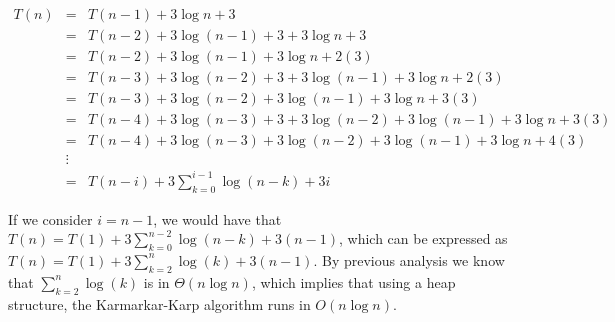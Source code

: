 \documentclass[tikz, 12pt]{scrartcl}
\begin{document}
\begin{eqnarray}
T(n)	&	=		&	T(n - 1) + 3 \log n + 3 \nonumber \\
		&	=		&	T(n - 2) + 3 \log(n - 1) + 3 + 3\log n + 3 \nonumber \\
		&	=		&	T(n - 2) + 3 \log(n - 1) + 3\log n + 2(3) \nonumber \\
		&	=		&	T(n - 3) + 3 \log(n - 2) + 3 + 3 \log(n - 1) + 3\log n + 2(3) \nonumber \\
		&	=		&	T(n - 3) + 3 \log(n - 2) + 3 \log(n - 1) + 3\log n + 3 (3) \nonumber \\
		&	=		&	T(n - 4) + 3 \log(n - 3) + 3  + 3 \log(n - 2) + 3 \log(n - 1) + 3\log n + 3 (3) \nonumber \\
		&	=		&	T(n - 4)	 + 3\log(n - 3)  + 3 \log(n - 2) + 3 \log(n - 1) + 3\log n + 4 (3) \nonumber \\
		&	\vdots	& \nonumber \\
		&	=		&	T(n - i) + 3 \sum_{k = 0}^{i-1} \log(n - k)  + 3i \label{generalRecurrenceKK}
\end{eqnarray}

If we consider $i = n - 1$, we would have that $T(n) = T(1) +  3 \sum_{k = 0}^{n-2} \log(n - k)  + 3(n - 1)$, which can be expressed as $T(n) = T(1) +  3 \sum_{k = 2}^{n} \log(k)  + 3(n - 1)$. By previous analysis we know that $\sum_{k = 2}^{n} \log(k) $ is in $\Theta(n \log n)$, which implies that using a heap structure, the Karmarkar-Karp algorithm runs in $O(n \log n)$.
\end{document}
